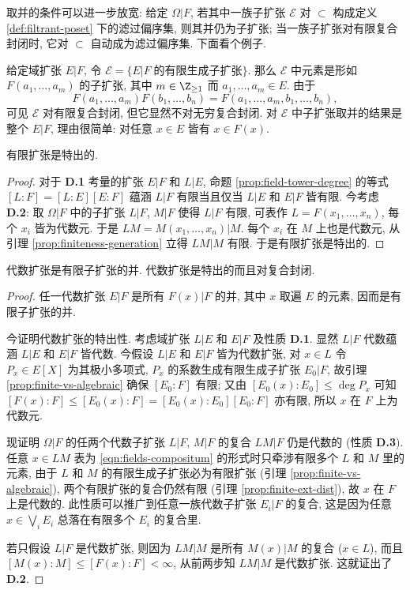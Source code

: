 取并的条件可以进一步放宽: 给定 $\Omega|F$, 若其中一族子扩张 $\mathcal{E}$ 对 $\subset$ 构成定义 \ref{def:filtrant-poset} 下的滤过偏序集, 则其并仍为子扩张; 当一族子扩张对有限复合封闭时, 它对 $\subset$ 自动成为滤过偏序集. 下面看个例子.
\begin{example}
	给定域扩张 $E|F$, 令 $\mathcal{E} = \{ E|F\; \text{的有限生成子扩张} \}$. 那么 $\mathcal{E}$ 中元素是形如 $F(a_1, \ldots, a_m)$ 的子扩张, 其中 $m \in \Z_{\geq 1}$ 而 $a_1, \ldots, a_m \in E$. 由于
	\[ F(a_1, \ldots, a_m) F(b_1, \ldots, b_n) = F(a_1, \ldots, a_m, b_1, \ldots, b_n), \]
	可见 $\mathcal{E}$ 对有限复合封闭, 但它显然不对无穷复合封闭. 对 $\mathcal{E}$ 中子扩张取并的结果是整个 $E|F$, 理由很简单: 对任意 $x \in E$ 皆有 $x \in F(x)$.
\end{example}

\begin{lemma}\label{prop:finite-ext-dist}
	有限扩张是特出的.
\end{lemma}
\begin{proof}
	对于 \textbf{D.1} 考量的扩张 $E|F$ 和 $L|E$, 命题 \ref{prop:field-tower-degree} 的等式 $[L:F]=[L:E][E:F]$ 蕴涵 $L|F$ 有限当且仅当 $L|E$ 和 $E|F$ 皆有限. 今考虑 \textbf{D.2}: 取 $\Omega|F$ 中的子扩张 $L|F$, $M|F$ 使得 $L|F$ 有限, 可表作 $L=F(x_1, \ldots, x_n)$, 每个 $x_i$ 皆为代数元. 于是 $LM = M(x_1, \ldots, x_n)|M$. 每个 $x_i$ 在 $M$ 上也是代数元, 从引理 \ref{prop:finiteness-generation} 立得 $LM|M$ 有限. 于是有限扩张是特出的.
\end{proof}

\begin{proposition}\label{prop:alg-ext-dist}
	代数扩张是有限子扩张的并. 代数扩张是特出的而且对复合封闭.
\end{proposition}
\begin{proof}
	任一代数扩张 $E|F$ 是所有 $F(x)|F$ 的并, 其中 $x$ 取遍 $E$ 的元素, 因而是有限子扩张的并.

	今证明代数扩张的特出性. 考虑域扩张 $L|E$ 和 $E|F$ 及性质 \textbf{D.1}. 显然 $L|F$ 代数蕴涵 $L|E$ 和 $E|F$ 皆代数. 今假设 $L|E$ 和 $E|F$ 皆为代数扩张, 对 $x \in L$ 令 $P_x \in E[X]$ 为其极小多项式, $P_x$ 的系数生成有限生成子扩张 $E_0|F$, 故引理 \ref{prop:finite-vs-algebraic} 确保 $[E_0:F]$ 有限; 又由 $[E_0(x) : E_0] \leq \deg P_x$ 可知 $[F(x):F] \leq [E_0(x):F] = [E_0(x):E_0] [E_0:F]$ 亦有限, 所以 $x$ 在 $F$ 上为代数元.

	现证明 $\Omega|F$ 的任两个代数子扩张 $L|F$, $M|F$ 的复合 $LM|F$ 仍是代数的 (性质 \textbf{D.3}). 任意 $x \in LM$ 表为 \eqref{eqn:fields-compositum} 的形式时只牵涉有限多个 $L$ 和 $M$ 里的元素, 由于 $L$ 和 $M$ 的有限生成子扩张必为有限扩张 (引理 \ref{prop:finite-vs-algebraic}), 两个有限扩张的复合仍然有限 (引理 \ref{prop:finite-ext-dist}), 故 $x$ 在 $F$ 上是代数的. 此性质可以推广到任意一族代数子扩张 $E_i|F$ 的复合, 这是因为任意 $x \in \bigvee_i E_i$ 总落在有限多个 $E_i$ 的复合里.

	若只假设 $L|F$ 是代数扩张, 则因为 $LM|M$ 是所有 $M(x)|M$ 的复合 ($x \in L$), 而且 $[M(x):M] \leq [F(x):F] < \infty$, 从前两步知 $LM|M$ 是代数扩张. 这就证出了 \textbf{D.2}.
\end{proof}

